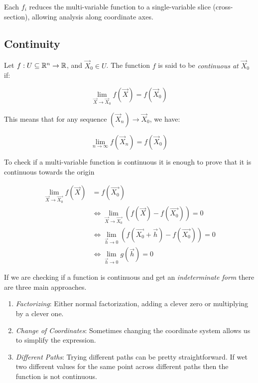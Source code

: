 Each \( f_i \) reduces the multi-variable function to a single-variable slice (cross-section), 
allowing analysis along coordinate axes.


\subsection{Continuity}

Let \( f : U \subseteq \mathbb{R}^n \to \mathbb{R} \), and \( \vec{X}_0 \in U \). The function 
\(f\) is said to be \emph{continuous at \( \vec{X}_0 \)} if:

\[
    \lim_{\vec{X} \to \vec{X}_0} f(\vec{X}) = f(\vec{X}_0)
\]

This means that for any sequence \( (\vec{X}_n) \to \vec{X}_0 \), we have:

\[
    \lim_{n \to \infty} f(\vec{X}_n) = f(\vec{X}_0)
\]

To check if a multi-variable function is continuous it is enough to prove that it is continuous towards 
the origin

\begin{align*}
    \lim_{\vec{X} \to \vec{X_0}}f(\vec{X}) &= f(\vec{X_0}) \\
    &\iff \lim_{\vec{X} \to \vec{X_0}} \left(f(\vec{X}) - f(\vec{X_0})\right) = 0 \\
    &\iff \lim_{\vec{h} \to 0} \left(f(\vec{X_0} + \vec{h}) - f(\vec{X_0})\right) = 0 \\
    &\iff \lim_{\vec{h} \to 0} g(\vec{h}) = 0
\end{align*}

If we are checking if a function is continuous and get an \emph{indeterminate form} there are three main 
approaches.

\begin{enumerate}
    
    \item \emph{Factorizing}: Either normal factorization, adding a clever zero or multiplying by a clever 
          one.
    
    \item \emph{Change of Coordinates}: Sometimes changing the coordinate system allows us to simplify the 
          expression.
    
    \item \emph{Different Paths}: Trying different paths can be pretty straightforward. If wet two 
          different values for the same point across different paths then the function is not continuous.

\end{enumerate}

